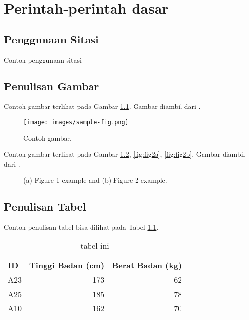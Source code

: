 \chapter{Perintah-perintah dasar}


\section{Penggunaan Sitasi}
Contoh penggunaan sitasi \cite{lukito2016,santosa2011user} \cite{lukito2016,santosa2011user,setiawan2014fuzzy,wibowo2014line}
\cite{setiawan2014fuzzy} \cite{wibowo2014line} \cite{marenda2016digitory} \cite{wibirama2013dual,wibowo2016clustering}

\section{Penulisan Gambar}

Contoh gambar terlihat pada Gambar \ref{Fig: Contoh gambar}. Gambar diambil dari \cite{wibowo2016clustering}.

\begin{figure}[h]
    \centering
    \texttt{[image: images/sample-fig.png]}
    \caption{Contoh gambar.}
    \label{Fig: Contoh gambar}
\end{figure}

Contoh gambar terlihat pada Gambar \ref{fig:fig2}, \ref{fig:fig2a}, \ref{fig:fig2b}. Gambar diambil dari \cite{wibowo2016clustering}.

\begin{figure}[h]
    \centering
    \caption{(a) Figure 1 example and (b) Figure 2 example.}
    \label{fig:fig2}
\end{figure}

\section{Penulisan Tabel}

Contoh penulisan tabel bisa dilihat pada Tabel \ref{Tab: Tabel Tinggi Berat}.
\begin{table}[h]
    \caption{tabel ini}
    \centering
    \vspace{0em}  %
    \begin{tabular}{lrr}
        \hline
        ID & Tinggi Badan (cm) & Berat Badan (kg) \\
        \hline
        A23 & 173 & 62 \\
        A25 & 185 & 78 \\
        A10 & 162 & 70 \\ \hline
    \end{tabular}
    \label{Tab: Tabel Tinggi Berat}
\end{table}

